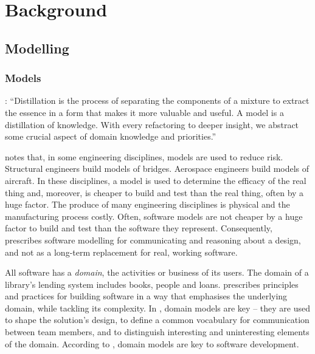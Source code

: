 
\chapter{Background}
\label{Background}

\section{Modelling}

\subsection{Models}

\cite[pg397]{evans04domain}: ``Distillation is the process of separating the components of a mixture to extract the essence in a form that makes it more valuable and useful. A model is a distillation of knowledge. With every refactoring to deeper insight, we abstract some crucial aspect of domain knowledge and priorities.''

\cite[ch14]{martin06agile} notes that, in some engineering disciplines, models are used to reduce risk. Structural engineers build models of bridges. Aerospace engineers build models of aircraft. In these disciplines, a model is used to determine the efficacy of the real thing and, moreover, is cheaper to build and test than the real thing, often by a huge factor. The produce of many engineering disciplines is physical and the manufacturing process costly. Often, software models are not cheaper by a huge factor to build and test than the software they represent. Consequently, \cite[ch14]{martin06agile} prescribes software modelling for communicating and reasoning about a design, and not as a long-term replacement for real, working software.

All software has a \emph{domain}, the activities or business of its users. The domain of a library's lending system includes books, people and loans. \cite{evans04domain} prescribes principles and practices for building software in a way that emphasises the underlying domain, while tackling its complexity. In \cite{evans04domain}, domain models are key -- they are used to shape the solution's design, to define a common vocabulary for communication between team members, and to distinguish interesting and uninteresting elements of the domain. According to \cite{evans04domain}, domain models are key to software development. 

